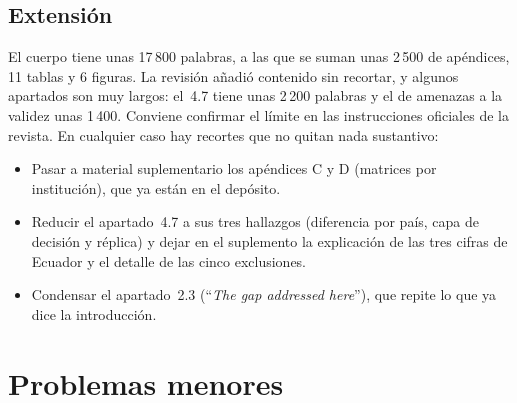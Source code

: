 \documentclass[11pt,a4paper]{article}
\newcommand{\cita}[1]{``\textit{#1}''}
\begin{document}
\subsection{Extensi\'on}

El cuerpo tiene unas 17\,800 palabras, a las que se suman unas 2\,500 de ap\'endices, 11 tablas y 6 figuras. La revisi\'on a\~nadi\'o contenido sin recortar, y algunos apartados son muy largos: el~4.7 tiene unas 2\,200 palabras y el de amenazas a la validez unas 1\,400. Conviene confirmar el l\'imite en las instrucciones oficiales de la revista. En cualquier caso hay recortes que no quitan nada sustantivo:
\begin{itemize}
	\item Pasar a material suplementario los ap\'endices C y D (matrices por instituci\'on), que ya est\'an en el dep\'osito.
	\item Reducir el apartado~4.7 a sus tres hallazgos (diferencia por pa\'is, capa de decisi\'on y r\'eplica) y dejar en el suplemento la explicaci\'on de las tres cifras de Ecuador y el detalle de las cinco exclusiones.
	\item Condensar el apartado~2.3 (\cita{The gap addressed here}), que repite lo que ya dice la introducci\'on.
\end{itemize}

\section{Problemas menores}\label{sec:menores}
\end{document}
